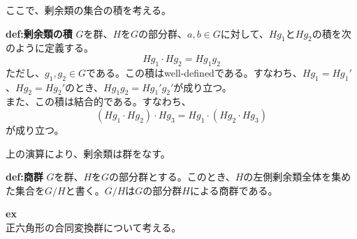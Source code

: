 \documentclass[a4paper,11pt]{jsarticle}
\begin{document}
ここで、剰余類の集合の積を考える。\\
\begin{itembox}[l]{\textbf{def:剰余類の積}}
    $G$を群、$H$を$G$の部分群、$a,b \in G$に対して、$Hg_1$と$Hg_2$の積を次のように定義する。\\
    \begin{equation}
        Hg_1 \cdot Hg_2 = Hg_1g_2
    \end{equation}
    ただし、$g_1,g_2 \in G$である。この積はwell-definedである。すなわち、$Hg_1 = Hg_1'$、$Hg_2 = Hg_2'$のとき、$Hg_1g_2 = Hg_1'g_2'$が成り立つ。\\
    また、この積は結合的である。すなわち、
    \begin{equation}
        (Hg_1 \cdot Hg_2) \cdot Hg_3 = Hg_1 \cdot (Hg_2 \cdot Hg_3)
    \end{equation}
    が成り立つ。
\end{itembox}
上の演算により、剰余類は群をなす。\\

\begin{itembox}[l]{\textbf{def:商群}}
    $G$を群、$H$を$G$の部分群とする。このとき、$H$の左側剰余類全体を集めた集合を$G/H$と書く。$G/H$は$G$の部分群$H$による商群である。

\end{itembox}
\textbf{ex}\\
正六角形の合同変換群について考える。\\
\end{document}
